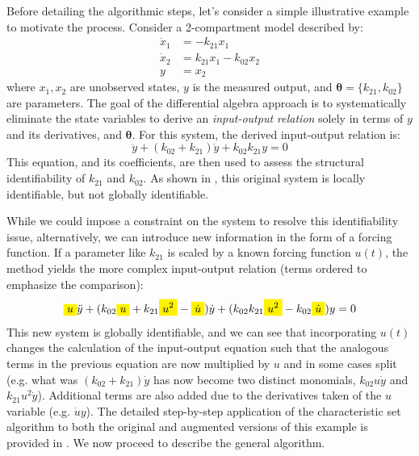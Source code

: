\documentclass[a4paper,fleqn]{cas-dc}
\newcommand{\mathcolorbox}[2]{\colorbox{#1}{$\displaystyle #2$}}
\theoremstyle{definition}
\begin{document}
Before detailing the algorithmic steps, let's consider a simple illustrative example to motivate the process. Consider a 2-compartment model described by:
\begin{equation}\label{eq:smallexample}
\begin{aligned}
     \dot{x}_1 & = -k_{21} x_1 \\
     \dot{x}_2 & = k_{21} x_1 - k_{02} x_2 \\
     y & = x_2
\end{aligned}
\end{equation}
where $x_1, x_2$ are unobserved states, $y$ is the measured output, and $\pmb{\theta} = \{k_{21}, k_{02}\}$ are parameters.
The goal of the differential algebra approach is to systematically eliminate the state variables to derive an \textit{input-output relation} solely in terms of $y$ and its derivatives, and $\pmb{\theta}$. For this system, the derived input-output relation is:
$$ \ddot{y} + (k_{02} + k_{21})\dot{y} + k_{02}k_{21} y = 0 $$
This equation, and its coefficients, are then used to assess the structural identifiability of $k_{21}$ and $k_{02}$. As shown in , this original system is locally identifiable, but not globally identifiable. 

While we could impose a constraint on the system to resolve this identifiability issue, alternatively, we can introduce new information in the form of a forcing function.
If a parameter like $k_{21}$ is scaled by a known forcing function $u(t)$, the method yields the more complex input-output relation (terms ordered to emphasize the comparison):
$$\mathcolorbox{Yellow}{u} \ddot{y}+ (k_{02}\mathcolorbox{Yellow}{u} + k_{21} \mathcolorbox{Yellow}{u^2} - \mathcolorbox{Yellow}{\dot{u}})\dot{y} 
+ (k_{02}k_{21}\mathcolorbox{Yellow}{u^2} - k_{02}\mathcolorbox{Yellow}{\dot{u}}) y = 0$$
This new system is globally identifiable, and we can see that incorporating $u(t)$ changes the calculation of the input-output equation such that the analogous terms in the previous equation are now multiplied by $u$ and in some cases split (e.g. what was $(k_{02}+k_{21})\dot{y}$ has now become two distinct monomials, $k_{02}u\dot{y}$ and $k_{21}u^2\dot{y}$). Additional terms are also added due to the derivatives taken of the $u$ variable (e.g. $\dot{u}y$). The detailed step-by-step application of the characteristic set algorithm to both the original and augmented versions of this example is provided in . We now proceed to describe the general algorithm.
\end{document}
